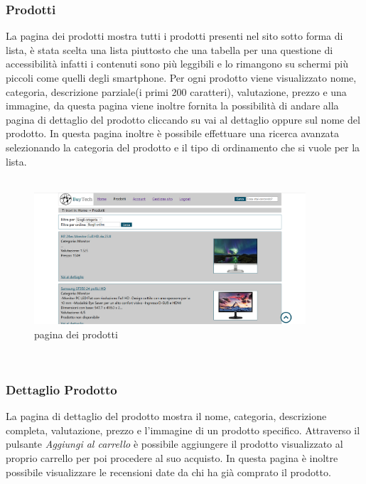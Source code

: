\subsubsection{Prodotti}
La pagina dei prodotti mostra tutti i prodotti presenti nel sito sotto forma di lista, è stata scelta una lista piuttosto che una tabella per una questione di accessibilità infatti i contenuti sono più leggibili e lo rimangono su schermi più piccoli come quelli degli smartphone.\newline
Per ogni prodotto viene visualizzato nome, categoria, descrizione parziale(i primi 200 caratteri), valutazione, prezzo e una immagine, da questa pagina viene inoltre fornita la possibilità di andare alla pagina di dettaglio del prodotto cliccando su vai al dettaglio oppure sul nome del prodotto.\newline
In questa pagina inoltre è possibile effettuare una ricerca avanzata selezionando la categoria del prodotto e il tipo di ordinamento che si vuole per la lista. \mbox{} \\ \mbox{} \\ \Spazio

\begin{figure}[h!]
	\label{prodotti} 
	\centering 
	\includegraphics[width=0.9\textwidth]{immagini/prodotti.png}
	\caption{pagina dei prodotti} 
\end{figure}
\mbox{} \\

\subsubsection{Dettaglio Prodotto}
La pagina di dettaglio del prodotto mostra il nome, categoria, descrizione completa, valutazione, prezzo e l'immagine di un prodotto specifico.\newline
Attraverso il pulsante \emph{Aggiungi al carrello} è possibile aggiungere il prodotto visualizzato al proprio carrello per poi procedere al suo acquisto.\newline
In questa pagina è inoltre possibile visualizzare le recensioni date da chi ha già comprato il prodotto.

